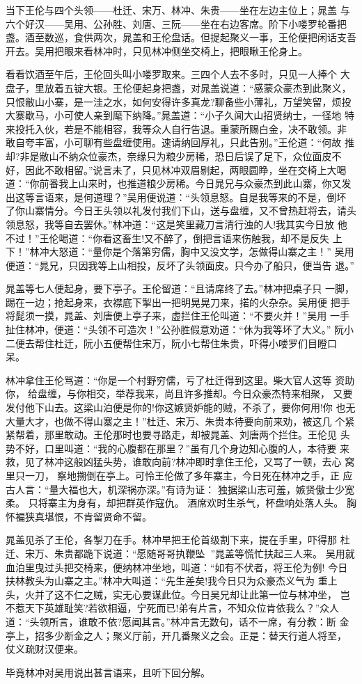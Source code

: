 当下王伦与四个头领——杜迁、宋万、林冲、朱贵——坐在左边主位上；晁盖
与六个好汉——吴用、公孙胜、刘唐、三阮——坐在右边客席。阶下小喽罗轮番把
盏。酒至数巡，食供两次，晁盖和王伦盘话。但提起聚义一事，王伦便把闲话支吾
开去。吴用把眼来看林冲时，只见林冲侧坐交椅上，把眼瞅王伦身上。

看看饮酒至午后，王伦回头叫小喽罗取来。三四个人去不多时，只见一人捧个
大盘子，里放着五锭大银。王伦便起身把盏，对晁盖说道：“感蒙众豪杰到此聚义，
只恨敝山小寨，是一洼之水，如何安得许多真龙?聊备些小薄礼，万望笑留，烦投
大寨歇马，小可使人亲到麾下纳降。”晁盖道：“小子久闻大山招贤纳士，一径地
特来投托入伙，若是不能相容，我等众人自行告退。重蒙所赐白金，决不敢领。非
敢自夸丰富，小可聊有些盘缠使用。速请纳回厚礼，只此告别。”王伦道：“何故
推却?非是敝山不纳众位豪杰，奈缘只为粮少房稀，恐日后误了足下，众位面皮不
好，因此不敢相留。”说言未了，只见林冲双眉剔起，两眼圆睁，坐在交椅上大喝
道：“你前番我上山来时，也推道粮少房稀。今日晁兄与众豪杰到此山寨，你又发
出这等言语来，是何道理？”吴用便说道：“头领息怒。自是我等来的不是，倒坏
了你山寨情分。今日王头领以礼发付我们下山，送与盘缠，又不曾热赶将去，请头
领息怒，我等自去罢休。”林冲道：“这是笑里藏刀言清行浊的人!我其实今日放
他不过！”王伦喝道：“你看这畜生!又不醉了，倒把言语来伤触我，却不是反失
上下！”林冲大怒道：“量你是个落第穷儒，胸中又没文学，怎做得山寨之主！”
吴用便道：“晁兄，只因我等上山相投，反坏了头领面皮。只今办了船只，便当告
退。”

晁盖等七人便起身，要下亭子。王伦留道：“且请席终了去。”林冲把桌子只
一脚，踢在一边；抢起身来，衣襟底下掣出一把明晃晃刀来，掿的火杂杂。吴用便
把手将髭须一摸，晁盖、刘唐便上亭子来，虚拦住王伦叫道：“不要火并！”吴用
一手扯住林冲，便道：“头领不可造次！”公孙胜假意劝道：“休为我等坏了大义。”
阮小二便去帮住杜迁，阮小五便帮住宋万，阮小七帮住朱贵，吓得小喽罗们目瞪口
呆。

林冲拿住王伦骂道：“你是一个村野穷儒，亏了杜迁得到这里。柴大官人这等
资助你，给盘缠，与你相交，举荐我来，尚且许多推却。今日众豪杰特来相聚，
又要发付他下山去。这梁山泊便是你的!你这嫉贤妒能的贼，不杀了，要你何用!你
也无大量大才，也做不得山寨之主！”杜迁、宋万、朱贵本待要向前来劝，被这几
个紧紧帮着，那里敢动。王伦那时也要寻路走，却被晁盖、刘唐两个拦住。王伦见
头势不好，口里叫道：“我的心腹都在那里？”虽有几个身边知心腹的人，本待要
来救，见了林冲这般凶猛头势，谁敢向前?林冲即时拿住王伦，又骂了一顿，去心
窝里只一刀，察地搠倒在亭上。可怜王伦做了多年寨主，今日死在林冲之手，正
应古人言：“量大福也大，机深祸亦深。”有诗为证：
独据梁山志可羞，嫉贤傲士少宽柔。
只将寨主为身有，却把群英作寇仇。
酒席欢时生杀气，杯盘响处落人头。
胸怀褊狭真堪恨，不肯留贤命不留。

晁盖见杀了王伦，各掣刀在手。林冲早把王伦首级割下来，提在手里，吓得那
杜迁、宋万、朱贵都跪下说道：“愿随哥哥执鞭坠！”晁盖等慌忙扶起三人来。
吴用就血泊里曳过头把交椅来，便纳林冲坐地，叫道：“如有不伏者，将王伦为例!
今日扶林教头为山寨之主。”林冲大叫道：“先生差矣!我今日只为众豪杰义气为
重上头，火并了这不仁之贼，实无心要谋此位。今日吴兄却让此第一位与林冲坐，
岂不惹天下英雄耻笑?若欲相逼，宁死而已!弟有片言，不知众位肯依我么？”众人
道：“头领所言，谁敢不依?愿闻其言。”林冲言无数句，话不一席，有分教：断
金亭上，招多少断金之人；聚义厅前，开几番聚义之会。正是：替天行道人将至，
仗义疏财汉便来。

毕竟林冲对吴用说出甚言语来，且听下回分解。